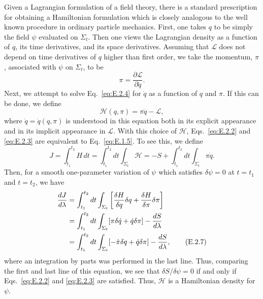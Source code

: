 Given a Lagrangian formulation of a field theory, there is a standard prescription
for obtaining a Hamiltonian formulation which is closely analogous to the well
known procedure in ordinary particle mechanics. First, one takes \(q\) to be simply
the field \(\psi\) evaluated on \(\Sigma_t\). Then one views the Lagrangian density
as a function of \(q\), its time derivatives, and its space derivatives. Assuming that
\(\mathcal L\) does not depend on time derivatives of \(q\) higher than first order,
we take the momentum, \(\pi\), associated with \(\psi\) on \(\Sigma_t\), to be
\begin{equation}
  \pi=\frac{\partial\mathcal L}{\partial\dot q}.
  \tag{E.2.4}\label{eq:E.2.4}
\end{equation}
Next, we attempt to solve Eq.~\eqref{eq:E.2.4} for \(\dot q\) as a function of
\(q\) and \(\pi\). If this can be done, we define
\begin{equation}
  \mathcal H(q,\pi)=\pi\dot q-\mathcal L,
  \tag{E.2.5}\label{eq:E.2.5}
\end{equation}
where \(\dot q=\dot q(q,\pi)\) is understood in this equation both in its explicit
appearance and in its implicit appearance in \(\mathcal L\). With this choice of
\(\mathcal H\), Eqs.~\eqref{eq:E.2.2} and \eqref{eq:E.2.3} are equivalent to
Eq.~\eqref{eq:E.1.5}. To see this, we define
\begin{equation}
  J=\int_{t_1}^{t_2}H\,dt
    =\int_{t_1}^{t_2}dt\int_{\Sigma_t}\mathcal H
    =-S+\int_{t_1}^{t_2}dt\int_{\Sigma_t}\pi\dot q .
  \tag{E.2.6}\label{eq:E.2.6}
\end{equation}
Then, for a smooth one-parameter variation of \(\psi\) which satisfies
\(\delta\psi=0\) at \(t=t_1\) and \(t=t_2\), we have
\begin{align}
  \frac{dJ}{d\lambda}
    &=\int_{t_1}^{t_2}dt\int_{\Sigma_t}
      \left[\frac{\delta H}{\delta q}\delta q
        +\frac{\delta H}{\delta\pi}\delta\pi\right]\notag\\
    &=\int_{t_1}^{t_2}dt\int_{\Sigma_t}
      [\pi\delta\dot q+\dot q\delta\pi]-\frac{dS}{d\lambda}\notag\\
    &=\int_{t_1}^{t_2}dt\int_{\Sigma_t}
      [-\dot\pi\delta q+\dot q\delta\pi]-\frac{dS}{d\lambda},
  \tag{E.2.7}\label{eq:E.2.7}
\end{align}
where an integration by parts was performed in the last line. Thus, comparing the
first and last line of this equation, we see that \(\delta S/\delta\psi=0\) if and
only if Eqs.~\eqref{eq:E.2.2} and \eqref{eq:E.2.3} are satisfied. Thus,
\(\mathcal H\) is a Hamiltonian density for \(\psi\).

